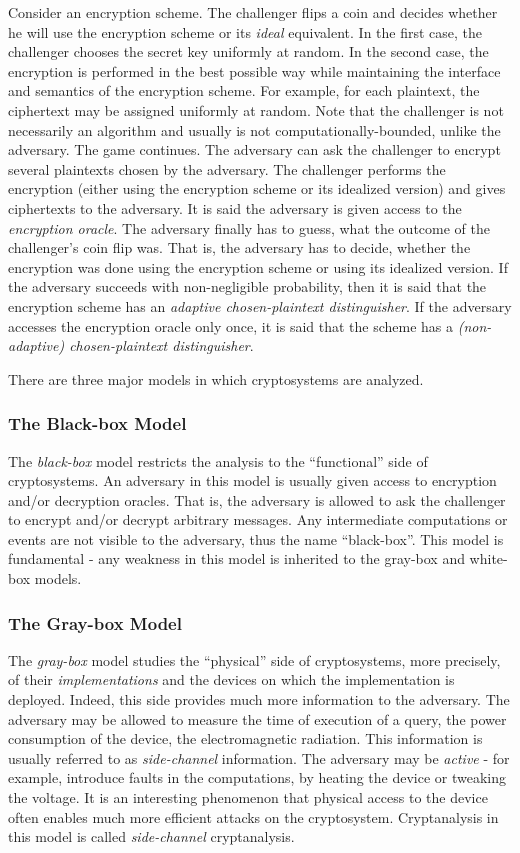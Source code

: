 Consider an encryption scheme. The challenger flips a coin and decides whether he will use the encryption scheme or its \emph{ideal} equivalent. In the first case, the challenger chooses the secret key uniformly at random. In the second case, the encryption is performed in the best possible way while maintaining the interface and semantics of the encryption scheme. For example, for each plaintext, the ciphertext may be assigned uniformly at random. Note that the challenger is not necessarily an algorithm and usually is not computationally-bounded, unlike the adversary. The game continues. The adversary can ask the challenger to encrypt several plaintexts chosen by the adversary. The challenger performs the encryption (either using the encryption scheme or its idealized version) and gives ciphertexts to the adversary. It is said the adversary is given access to the \emph{encryption oracle}.
The adversary finally has to guess, what the outcome of the challenger's coin flip was. That is, the adversary has to decide, whether the encryption was done using the encryption scheme or using its idealized version. If the adversary succeeds with non-negligible probability, then it is said that the encryption scheme has an  \emph{adaptive chosen-plaintext distinguisher}. If the adversary accesses the encryption oracle only once, it is said that the scheme has a \emph{(non-adaptive) chosen-plaintext distinguisher}.

There are three major models in which cryptosystems are analyzed. 

\subsubsection{The Black-box Model}
The \emph{black-box} model restricts the analysis to the ``functional'' side of cryptosystems. An adversary in this model is usually given access to encryption and/or decryption oracles. That is, the adversary is allowed to ask the challenger to encrypt and/or decrypt arbitrary messages. Any intermediate computations or events are not visible to the adversary, thus the name ``black-box''. This model is fundamental - any weakness in this model is inherited to the gray-box and white-box models.

\subsubsection{The Gray-box Model}
The \emph{gray-box} model studies the ``physical'' side of cryptosystems, more precisely, of their \emph{implementations} and the devices on which the implementation is deployed. Indeed, this side provides much more information to the adversary. The adversary may be allowed to measure the time of execution of a query, the power consumption of the device, the electromagnetic radiation. This information is usually referred to as \emph{side-channel} information.
The adversary may be \emph{active} - for example, introduce faults in the computations, by heating the device or tweaking the voltage. It is an interesting phenomenon that physical access to the device often enables much more efficient attacks on the cryptosystem. Cryptanalysis in this model is called \emph{side-channel} cryptanalysis.

